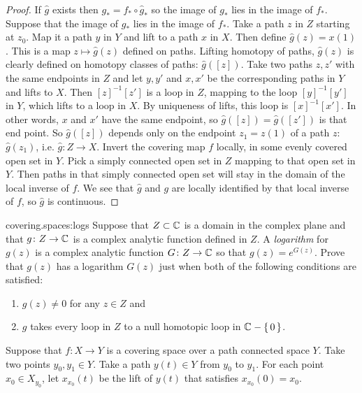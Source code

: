 \begin{proof}
If \(\hat{g}\) exists then \(g_*=f_* \circ \hat{g}_*\) so the image of \(g_*\) lies in the image of \(f_*\).
Suppose that the image of \(g_*\) lies in the image of \(f_*\).
Take a path \(z\) in \(Z\) starting at \(z_0\).
Map it a path \(y\) in \(Y\) and lift to a path \(x\) in \(X\).
Then define \(\hat{g}(z)=x(1)\).
This is a map \(z \mapsto \hat{g}(z)\) defined on paths.
Lifting homotopy of paths, \(\hat{g}(z)\) is clearly defined on homotopy classes of paths: \(\hat{g}([z])\).
Take two paths \(z,z'\) with the same endpoints in \(Z\) and let \(y,y'\) and \(x,x'\) be the corresponding paths in \(Y\) and lifts to \(X\).
Then \([z]^{-1}[z']\) is a loop in \(Z\), mapping to the loop \([y]^{-1}[y']\) in \(Y\), which lifts to a loop in \(X\).
By uniqueness of lifts, this loop is \([x]^{-1}[x']\).
In other words, \(x\) and \(x'\) have the same endpoint, so \(\hat{g}([z])=\hat{g}([z'])\) is that end point.
So \(\hat{g}([z])\) depends only on the endpoint \(z_1=z(1)\) of a path \(z\): \(\hat{g}(z_1)\), i.e. \(\hat{g} \colon Z \to X\).
Invert the covering map \(f\) locally, in some evenly covered open set in \(Y\).
Pick a simply connected open set in \(Z\) mapping to that open set in \(Y\).
Then paths in that simply connected open set will stay in the domain of the local inverse of \(f\).
We see that \(\hat{g}\) and \(g\) are locally identified by that local inverse of \(f\), so \(\hat{g}\) is continuous.
\end{proof}
\begin{problem}{covering.spaces:logs}
Suppose that \(Z \subset \mathbb{C}^{}\) is a domain in the complex plane and that \(g \colon Z \to \mathbb{C}^{}\) is a complex analytic function defined in \(Z\).
A \emph{logarithm} for \(g(z)\) is a complex analytic function \(G \colon Z \to \mathbb{C}^{}\) so that \(g(z)=e^{G(z)}\).
Prove that \(g(z)\) has a logarithm \(G(z)\) just when both of the following conditions are satisfied:
\begin{enumerate}
\item \(g(z) \ne 0\) for any \(z \in Z\) and
\item \(g\) takes every loop in \(Z\) to a null homotopic loop in \(\mathbb{C}^{}-\set{0}\).
\end{enumerate}
\end{problem}
Suppose that \(f \colon X \to Y\) is a covering space over a path connected space \(Y\).
Take two points \(y_0, y_1 \in Y\).
Take a path \(y(t) \in Y\) from \(y_0\) to \(y_1\).
For each point \(x_0 \in X_{y_0}\), let \(x_{x_0}(t)\) be the lift of \(y(t)\) that satisfies \(x_{x_0}(0)=x_0\).
